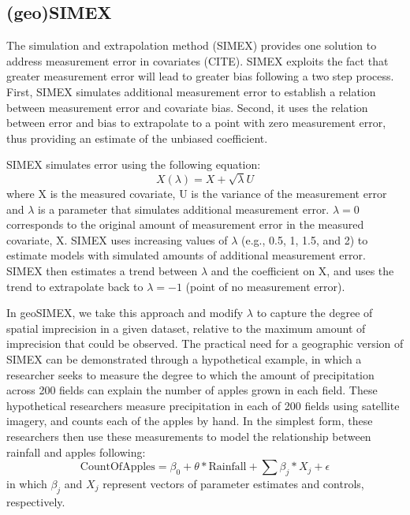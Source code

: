 \subsection{(geo)SIMEX}
The simulation and extrapolation method (SIMEX) provides one solution to address measurement error in covariates (CITE). SIMEX exploits the fact that greater measurement error will lead to greater bias following a two step process. First, SIMEX simulates additional measurement error to establish a relation between measurement error and covariate bias. Second, it uses the relation between error and bias to extrapolate to a point with zero measurement error, thus providing an estimate of the unbiased coefficient.
\par
SIMEX simulates error using the following equation:
\begin{equation}
X(\lambda) = X + \sqrt{\lambda}U
\end{equation}
where X is the measured covariate, U is the variance of the measurement error and $\lambda$ is a parameter that simulates additional measurement error. $\lambda=0$ corresponds to the original amount of measurement error in the measured covariate, X. SIMEX uses increasing values of $\lambda$ (e.g., 0.5, 1, 1.5, and 2) to estimate models with simulated amounts of additional measurement error. SIMEX then estimates a trend between $\lambda$ and the coefficient on X, and uses the trend to extrapolate back to $\lambda = -1$ (point of no measurement error).
\par
In geoSIMEX, we take this approach and modify $\lambda$ to capture the degree of spatial imprecision in a given dataset, relative to the maximum amount of imprecision that could be observed.
The practical need for a geographic version of SIMEX can be demonstrated through a hypothetical example, in which a researcher seeks to measure the degree to which the amount of precipitation across 200 fields can explain the number of apples grown in each field.
These hypothetical researchers measure precipitation in each of 200 fields using satellite imagery, and counts each of the apples by hand.
In the simplest form, these researchers then use these measurements to model the relationship between rainfall and apples following:
\begin{equation}\label{eq:precip}
\text{CountOfApples} = \beta_{0} + \theta * \text{Rainfall} + \sum{\beta_{j} * X_{j}} + \epsilon
\end{equation}
\noindent in which $\beta_{j}$ and $X_{j}$ represent vectors of parameter estimates and controls, respectively. 
